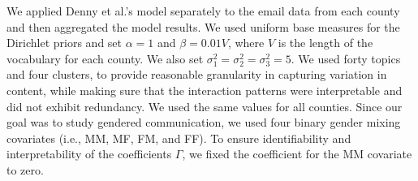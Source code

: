 \documentclass{pnastwo}
\begin{document}
\begin{article}

  



We applied Denny et al.'s model separately to the email data from each
county and then aggregated the model results. We used uniform base
measures for the Dirichlet priors and set $\alpha = 1$ and $\beta =
0.01 V$, where $V$ is the length of the vocabulary for each county. We
also set $\sigma_1^2 = \sigma_2^2 = \sigma^2_3 = 5$. We used forty
topics and four clusters, to provide reasonable granularity in
capturing variation in content, while making sure that the interaction
patterns were interpretable and did not exhibit redundancy. We used
the same values for all counties. Since our goal was to study gendered
communication, we used four binary gender mixing covariates (i.e., MM,
MF, FM, and FF). To ensure identifiability and interpretability of
the coefficients $\Gamma$, we fixed the coefficient for the MM covariate to
zero.


\end{article}
\end{document}
